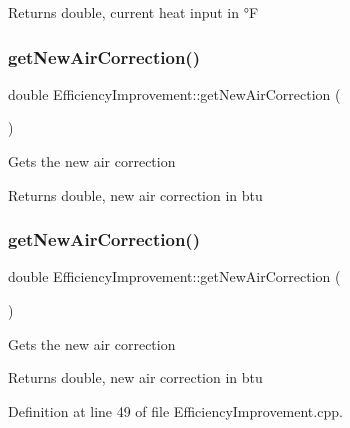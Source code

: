\begin{DoxyReturn}{Returns}
double, current heat input in °F 
\end{DoxyReturn}
\mbox{\label{class_efficiency_improvement_a0339daa6d9cfc25e8da4f9efef73b3d8}} 
\subsubsection{\texorpdfstring{get\+New\+Air\+Correction()}{getNewAirCorrection()}\hspace{0.1cm}{\footnotesize\ttfamily [1/3]}}
{\footnotesize\ttfamily double Efficiency\+Improvement\+::get\+New\+Air\+Correction (\begin{DoxyParamCaption}{ }\end{DoxyParamCaption})}

Gets the new air correction

\begin{DoxyReturn}{Returns}
double, new air correction in btu 
\end{DoxyReturn}
\mbox{\label{class_efficiency_improvement_a0339daa6d9cfc25e8da4f9efef73b3d8}} 
\subsubsection{\texorpdfstring{get\+New\+Air\+Correction()}{getNewAirCorrection()}\hspace{0.1cm}{\footnotesize\ttfamily [2/3]}}
{\footnotesize\ttfamily double Efficiency\+Improvement\+::get\+New\+Air\+Correction (\begin{DoxyParamCaption}{ }\end{DoxyParamCaption})}

Gets the new air correction

\begin{DoxyReturn}{Returns}
double, new air correction in btu 
\end{DoxyReturn}


Definition at line 49 of file Efficiency\+Improvement.\+cpp.

